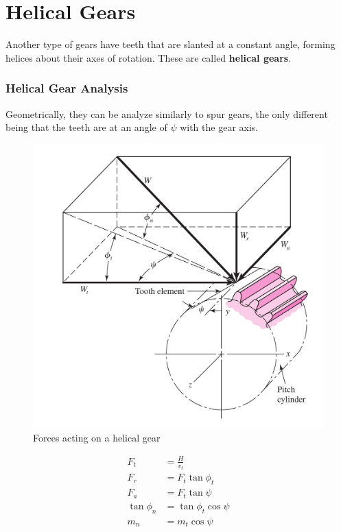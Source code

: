 \documentclass[a4paper,openany]{kaobook}
\begin{document}
\chapter{Helical Gears}
\label{sec:orgddc85be}

Another type of gears have teeth that are slanted at a constant angle, forming helices about their axes of rotation. These are called \textbf{helical gears}.


\subsection{Helical Gear Analysis}
\label{sec:orge44fb46}

Geometrically, they can be analyze similarly to spur gears, the only different being that the teeth are at an angle of \(\psi\) with the gear axis.

\begin{figure}[htbp]
\centering
\includegraphics[width=.9\linewidth]{./pictures/Gears/helical-gear-forces.png}
\caption{\label{fig: helical gear forces}Forces acting on a helical gear}
\end{figure}

\begin{align}
  F_{t} &= \frac{H}{v_{t}} \\
  F_{r} &= F_{t} \tan \phi_{t} \\
  F_{a} &= F_{t} \tan \psi \\
  \tan \phi_{n} &= \tan \phi_{t} \cos \psi \\
  m_{n} &= m_{t} \cos \psi
\end{align}
\end{document}
